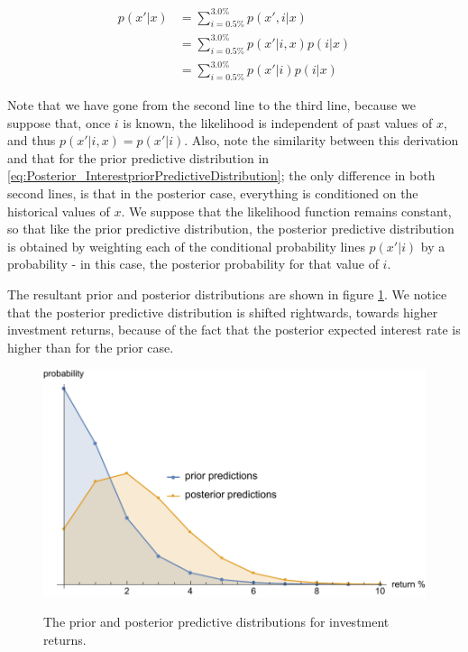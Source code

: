 \documentclass[11pt,fullpage]{book}
\begin{document}
\begin{equation}
\begin{align}
p(x'|x) &= \sum\limits_{i=0.5\%}^{3.0\%} p(x',i|x)\\
&= \sum\limits_{i=0.5\%}^{3.0\%} p(x'|i,x) p(i|x)\\
&= \sum\limits_{i=0.5\%}^{3.0\%} p(x'|i) p(i|x)
\end{align}
\end{equation}

Note that we have gone from the second line to the third line, because we suppose that, once $i$ is known, the likelihood is independent of past values of $x$, and thus $p(x'|i,x)=p(x'|i)$. Also, note the similarity between this derivation and that for the prior predictive distribution in \ref{eq:Posterior_InterestpriorPredictiveDistribution}; the only difference in both second lines, is that in the posterior case, everything is conditioned on the historical values of $x$. We suppose that the likelihood function remains constant, so that like the prior predictive distribution, the posterior predictive distribution is obtained by weighting each of the conditional probability lines $p(x'|i)$ by a probability - in this case, the posterior probability for that value of $i$. 

The resultant prior and posterior distributions are shown in figure \ref{fig:Posterior_priorPosteriorPredictiveInterestRate}. We notice that the posterior predictive distribution is shifted rightwards, towards higher investment returns, because of the fact that the posterior expected interest rate is higher than for the prior case.

\begin{figure}
\centering
\scalebox{0.65} 
{\includegraphics{Posterior_priorPosteriorPredictiveInterestRate.pdf}}
\caption{The prior and posterior predictive distributions for investment returns.}\label{fig:Posterior_priorPosteriorPredictiveInterestRate}
\end{figure}
\end{document}
